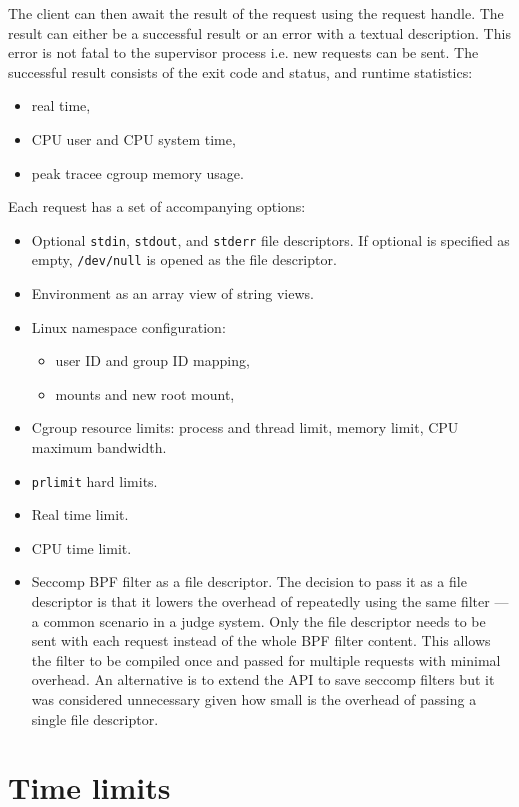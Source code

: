 \documentclass[en]{pracamgr}
\begin{document}
The client can then await the result of the request using the request handle. The result can either be a successful result or an error with a textual description. This error is not fatal to the supervisor process i.e. new requests can be sent. The successful result consists of the exit code and status, and runtime statistics:
\begin{itemize}
    \item real time,
    \item CPU user and CPU system time,
    \item peak tracee cgroup memory usage.
\end{itemize}
Each request has a set of accompanying options:
\begin{itemize}
    \item Optional \texttt{stdin}, \texttt{stdout}, and \texttt{stderr} file descriptors. If optional is specified as empty, \texttt{/dev/null} is opened as the file descriptor.
    \item Environment as an array view of string views.
    \item Linux namespace configuration:
        \begin{itemize}
            \item user ID and group ID mapping,
            \item mounts and new root mount,
        \end{itemize}
    \item Cgroup resource limits: process and thread limit, memory limit, CPU maximum bandwidth.
    \item \texttt{prlimit} hard limits.
    \item Real time limit.
    \item CPU time limit.
    \item Seccomp BPF filter as a file descriptor. The decision to pass it as a file descriptor is that it lowers the overhead of repeatedly using the same filter --- a common scenario in a judge system. Only the file descriptor needs to be sent with each request instead of the whole BPF filter content. This allows the filter to be compiled once and passed for multiple requests with minimal overhead. An alternative is to extend the API to save seccomp filters but it was considered unnecessary given how small is the overhead of passing a single file descriptor.
\end{itemize}

\section{Time limits}
\end{document}
